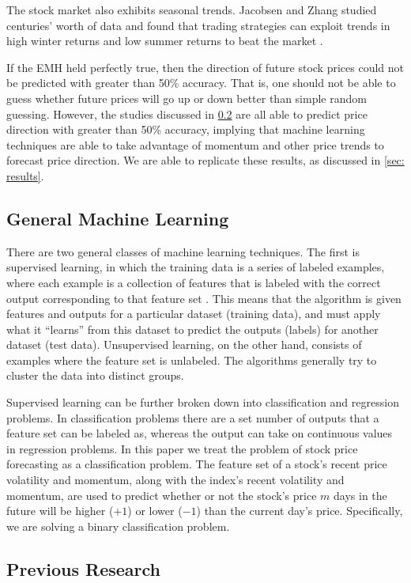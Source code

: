 \documentclass[pageno]{jpaper}
\begin{document}
The stock market also exhibits seasonal trends. Jacobsen and Zhang studied centuries' worth of data and found that trading strategies can exploit trends in high winter returns and low summer returns to beat the market \cite{jacobsen2}\cite{jacobsen1}.

If the EMH held perfectly true, then the direction of future stock prices could not be predicted with greater than 50\% accuracy. That is, one should not be able to guess whether future prices will go up or down better than simple random guessing. However, the studies discussed in \ref{subsec: previous} are all able to predict price direction with greater than 50\% accuracy, implying that machine learning techniques are able to take advantage of momentum and other price trends to forecast price direction. We are able to replicate these results, as discussed in \ref{sec: results}.

\subsection{General Machine Learning}
There are two general classes of machine learning techniques. The first is supervised learning, in which the training data is a series of labeled examples, where each example is a collection of features that is labeled with the correct output corresponding to that feature set \cite{brownlee}. This means that the algorithm is given features and outputs for a particular dataset (training data), and must apply what it ``learns'' from this dataset to predict the outputs (labels) for another dataset (test data). Unsupervised learning, on the other hand, consists of examples where the feature set is unlabeled. The algorithms generally try to cluster the data into distinct groups.

Supervised learning can be further broken down into classification and regression problems. In classification problems there are a set number of outputs that a feature set can be labeled as, whereas the output can take on continuous values in regression problems. In this paper we treat the problem of stock price forecasting as a classification problem. The feature set of a stock's recent price volatility and momentum, along with the index's recent volatility and momentum, are used to predict whether or not the stock's price $m$ days in the future will be higher ($+1$) or lower ($-1$) than the current day's price. Specifically, we are solving a binary classification problem.

\subsection{Previous Research}
\label{subsec: previous}
\end{document}
